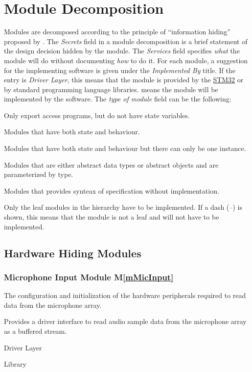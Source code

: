 \documentclass[12pt, titlepage]{article}
\newcommand{\mref}[1]{M\ref{#1}}
\begin{document}
\section{Module Decomposition} \label{SecMD}

Modules are decomposed according to the principle of ``information hiding''
proposed by \cite{ParnasEtAl1984}. The \emph{Secrets} field in a module
decomposition is a brief statement of the design decision hidden by the module.
The \emph{Services} field specifies \emph{what} the module will do without
documenting \emph{how} to do it. For each module, a suggestion for the
implementing software is given under the \emph{Implemented By} title. If the
entry is \emph{Driver Layer}, this means that the module is provided by the
\hyperref[SRS-def:stm32]{STM32} or by standard programming language libraries.
\emph{\progname{}} means the module will be implemented by the \progname{}
software.
\newline
\newline
\noindent The \emph{type of module} field can be the following:
\begin{description}[before=\small, labelindent=0.5cm]
  \item [Library: ] Only export access programs, but do not have state
    variables.
  \item [Abstract Data Type: ] Modules that have both state and behaviour.
  \item [Abstract Object: ] Modules that have both state and behaviour but there
    can only be one instance.
  \item [Generic Modules: ] Modules that are either abstract data types or
    abstract objects and are parameterized by type.
  \item [Interface Modules: ] Modules that provides synteax of specification
    without implementation.
\end{description}


Only the leaf modules in the hierarchy have to be implemented. If a dash
(\emph{--}) is shown, this means that the module is not a leaf and will not have
to be implemented.

\subsection{Hardware Hiding Modules}

\subsubsection{Microphone Input Module \mref{mMicInput}}
\begin{description}[labelindent=0.5cm]
\item [Secrets: ] The configuration and initialization of the hardware
peripherals required to read data from the microphone array. 
\item [Services: ] Provides a driver interface to read audio sample data from
the microphone array as a buffered stream.
\item [Implemented By: ] Driver Layer
\item[Type of Module:] Library 
\end{description}
\end{document}
